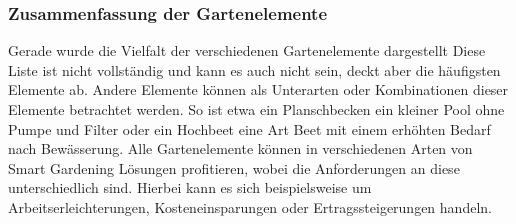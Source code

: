 \subsubsection{Zusammenfassung der Gartenelemente}
Gerade wurde die Vielfalt der verschiedenen Gartenelemente dargestellt
Diese Liste ist nicht vollständig und kann es auch nicht sein, deckt aber die häufigsten Elemente ab.
Andere Elemente können als Unterarten oder Kombinationen dieser Elemente betrachtet werden.
So ist etwa ein Planschbecken ein kleiner Pool ohne Pumpe und Filter oder ein Hochbeet eine Art Beet mit einem erhöhten Bedarf nach Bewässerung.
Alle Gartenelemente können in verschiedenen Arten von Smart Gardening Lösungen profitieren, wobei die Anforderungen an diese unterschiedlich sind.
Hierbei kann es sich beispielsweise um Arbeitserleichterungen, Kosteneinsparungen oder Ertragssteigerungen handeln.
\pagebreak
